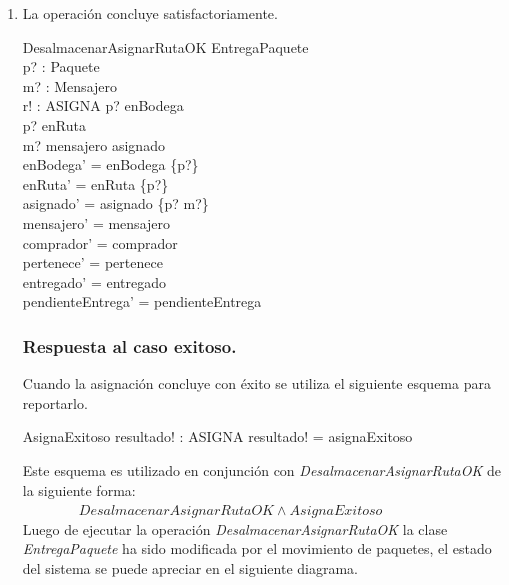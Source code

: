 \documentclass[12pt,a4paper,table]{article}
\begin{document}
\begin{enumerate}
\item La operación concluye satisfactoriamente.

\begin{schema}{DesalmacenarAsignarRutaOK}
\Delta EntregaPaquete\\
p? : Paquete\\
m? : Mensajero\\
r! : ASIGNA
\where
p? \in enBodega\\
p? \notin  enRuta\\
m? \in mensajero \setminus \ran asignado\\
enBodega' = enBodega \setminus \{p?\}\\
enRuta' = enRuta \cup \{p?\}\\
asignado' = asignado \cup \{p? \mapsto m?\}\\
mensajero' = mensajero\\
comprador' = comprador\\
pertenece' = pertenece\\
entregado' = entregado\\
pendienteEntrega' = pendienteEntrega
\end{schema}

\subsubsection*{Respuesta al caso exitoso.}
\indent Cuando la asignación concluye con éxito se utiliza el siguiente esquema para reportarlo.

\begin{schema}{AsignaExitoso}
resultado! : ASIGNA
\where
resultado! = asignaExitoso
\end{schema}

Este esquema es utilizado en conjunción con \textit{DesalmacenarAsignarRutaOK} de la siguiente forma:\\

~~~~~~~~$DesalmacenarAsignarRutaOK \wedge AsignaExitoso$\\

Luego de ejecutar la operación \textit{DesalmacenarAsignarRutaOK} la clase \textit{EntregaPaquete} ha sido modificada por el movimiento de paquetes, el estado del sistema se puede apreciar en el siguiente diagrama.

\begin{figure}[H]
\centering
\begin{tikzpicture}


\end{tikzpicture}
\end{figure}
\end{enumerate}
\end{document}
